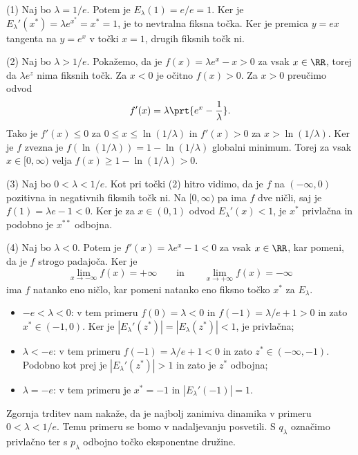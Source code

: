 \begin{dokaz}
    (1) Naj bo \(\lambda = 1/e\). Potem je \(E_\lambda (1) = e/e = 1\). Ker je \(E_\lambda' (x^*) = \lambda e^{x^*} = x^* = 1\), je to nevtralna fiksna točka. Ker je premica \(y = ex\) tangenta na \(y = e^x\) v točki \(x = 1\), drugih fiksnih točk ni.

    (2) Naj bo \(\lambda > 1/e\). Pokažemo, da je \(f (x) = \lambda e^x - x > 0\) za vsak \(x \in \RR\), torej da \(\lambda e^z\) nima fiksnih točk. Za \(x < 0\) je očitno \(f (x) > 0\). Za \(x > 0\) preučimo odvod
    \[f' (x) = \lambda \prt{e^x - \frac{1}{\lambda}}.\]
    Tako je \(f' (x) \leq 0\) za \(0 \leq x \leq \ln (1 / \lambda)\) in \(f' (x) > 0\) za \(x > \ln (1 / \lambda)\). Ker je \(f\) zvezna je \(f (\ln(1/\lambda)) = 1 - \ln (1 / \lambda)\) globalni minimum. Torej za vsak \(x \in [0, \infty)\) velja \(f (x) \geq 1 - \ln (1 / \lambda) > 0\).

    (3) Naj bo \(0 < \lambda < 1/e\). Kot pri točki (2) hitro vidimo, da je \(f\) na \((- \infty, 0)\) pozitivna in negativnih fiksnih točk ni. Na \([0, \infty)\) pa ima \(f\) dve ničli, saj je \(f (1) = \lambda e - 1 < 0\). Ker je za \(x \in (0, 1)\) odvod \(E_\lambda' (x) < 1\), je \(x^*\) privlačna in podobno je \(x^{**}\) odbojna.

    (4) Naj bo \(\lambda < 0\). Potem je \(f' (x) = \lambda e^x - 1 < 0\) za vsak \(x \in \RR\), kar pomeni, da je \(f\) strogo padajoča. Ker je
    \[\lim_{x \to - \infty} f (x) = + \infty \qquad \text{in} \qquad \lim_{x \to + \infty} f (x) = - \infty\]
    ima \(f\) natanko eno ničlo, kar pomeni natanko eno fiksno točko \(x^*\) za \(E_\lambda\).
    \begin{itemize}
        \item \(-e < \lambda < 0\): v tem primeru \(f (0) = \lambda < 0\) in \(f (-1) = \lambda / e + 1 > 0\) in zato \(x^* \in (-1, 0)\). Ker je \(|E_\lambda' (z^*)| = |E_\lambda (z^*)| < 1\), je privlačna;
        \item \(\lambda < -e\): v tem primeru \(f (-1) = \lambda / e + 1 < 0\) in zato \(z^* \in (- \infty, -1)\). Podobno kot prej je \(|E_\lambda' (z^*)| > 1\) in zato je \(z^*\) odbojna;
        \item \(\lambda = - e\): v tem primeru je \(x^* = -1\) in \(|E_\lambda' (-1)| = 1\).
    \end{itemize}
\end{dokaz}

\noindent Zgornja trditev nam nakaže, da je najbolj zanimiva dinamika v primeru \(0 < \lambda < 1/e\). Temu primeru se bomo v nadaljevanju posvetili. S \(q_\lambda\) označimo privlačno ter s \(p_\lambda\) odbojno točko eksponentne družine.

